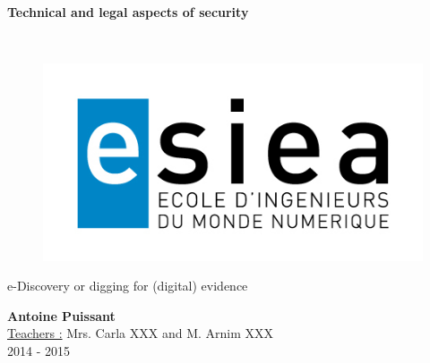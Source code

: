 \begin{titlepage}
      \begin{center}   
        \Huge
        \textbf{Technical and legal aspects of security}
        
        \LARGE
        ~
        
        
        \vfill
        \begin{figure}[H]
	    \centering
	    \begin{minipage}{0.9\textwidth}
		\centering
		\includegraphics[width=\textwidth]{./img/esiea.jpeg}
	    \end{minipage}\hfill
	\end{figure}
        \vfill
        
        \vspace{0.5cm}
        
        e-Discovery or digging for (digital) evidence
        
        \vspace{2cm}
        \textbf{Antoine Puissant}\\
        \vspace{0.8cm}
        \Large
        \underline{Teachers :} Mrs. Carla XXX and M. Arnim XXX\\
        \vspace{0.5cm}
        2014 - 2015%
        
    \end{center}
\end{titlepage}